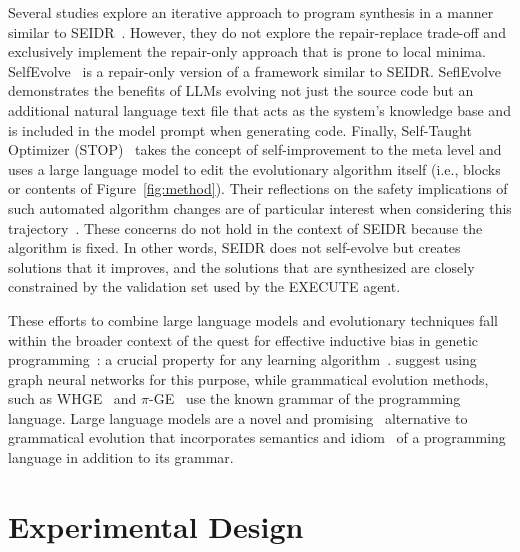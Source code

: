 Several studies explore an iterative approach to program synthesis in a manner similar to SEIDR~\cite{xiaConversationalAutomatedProgram2023,chenTeachingLargeLanguage2023,shinnReflexionLanguageAgents2023}. 
However, they do not explore the repair-replace trade-off and exclusively implement the repair-only approach that is prone to local minima.
SelfEvolve~\cite{jiangSelfEvolveCodeEvolution2023} is a repair-only version of a framework similar to SEIDR.
SeflEvolve demonstrates the benefits of LLMs evolving not just the source code but an additional natural language text file that acts as the system's knowledge base and is included in the model prompt when generating code. 
Finally, Self-Taught Optimizer (STOP)~\cite{zelikmanSelfTaughtOptimizerSTOP2023} takes the concept of self-improvement to the meta level and uses a large language model to edit the evolutionary algorithm itself (i.e., blocks or contents of Figure~\ref{fig:method}). 
Their reflections on the safety implications of such automated algorithm changes are of particular interest when considering this trajectory~\cite[Section 8]{zelikmanSelfTaughtOptimizerSTOP2023}. These concerns do not hold in the context of SEIDR because the algorithm is fixed.
In other words, SEIDR does not self-evolve but creates solutions that it improves, and the solutions that are synthesized are closely constrained by the validation set used by the EXECUTE agent.

These efforts to combine large language models and evolutionary techniques fall within the broader context of the quest for effective inductive bias in genetic programming~\cite{whighamSearchBiasLanguage1996}: a crucial property for any learning algorithm~\cite{haussler1988:quantifying}. 
\cite{reuterGraphNetworksInductive2023} suggest using graph neural networks for this purpose, while grammatical evolution methods, such as WHGE~\cite{bartoliWeightedHierarchicalGrammatical2020} and $\pi$-GE~\cite{oneill2004:pgrammatical} use the known grammar of the programming language.
Large language models are a novel and promising~\cite{custodeComparingLargeLanguage2024} alternative to grammatical evolution that incorporates semantics and idiom~\cite{allamanisMiningIdiomsSource2014,orlovFindingIdiomsSource2020} of a programming language in addition to its grammar. 

\section{Experimental Design}
\label{sec:seidr-eval}

